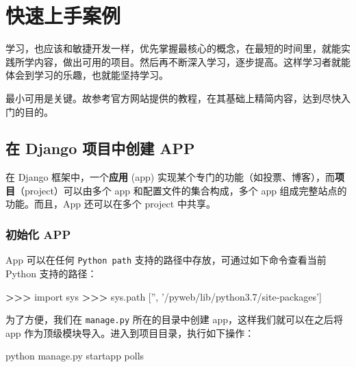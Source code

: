 \documentclass[]{ctexbook}
\newenvironment{Shaded}{\begin{snugshade}}{\end{snugshade}}
\newcommand{\ExtensionTok}[1]{#1}
\newcommand{\ImportTok}[1]{#1}
\newcommand{\NormalTok}[1]{#1}
\newcommand{\OperatorTok}[1]{\textcolor[rgb]{0.81,0.36,0.00}{\textbf{#1}}}
\newcommand{\StringTok}[1]{\textcolor[rgb]{0.31,0.60,0.02}{#1}}
\begin{document}
\hypertarget{quicktutorial}{%
\chapter{快速上手案例}\label{quicktutorial}}

学习，也应该和敏捷开发一样，优先掌握最核心的概念，在最短的时间里，就能实践所学内容，做出可用的项目。然后再不断深入学习，逐步提高。这样学习者就能体会到学习的乐趣，也就能坚持学习。

最小可用是关键。故参考官方网站提供的教程，在其基础上精简内容，达到尽快入门的目的。

\hypertarget{ux5728-django-ux9879ux76eeux4e2dux521bux5efa-app}{%
\section{在 Django 项目中创建 APP}\label{ux5728-django-ux9879ux76eeux4e2dux521bux5efa-app}}

在 Django 框架中，一个\textbf{应用} (app) 实现某个专门的功能（如投票、博客），而\textbf{项目}（project）可以由多个 app 和配置文件的集合构成，多个 app 组成完整站点的功能。而且，App 还可以在多个 project 中共享。

\hypertarget{ux521dux59cbux5316-app}{%
\subsection{初始化 APP}\label{ux521dux59cbux5316-app}}

App 可以在任何 \texttt{Python\ path} 支持的路径中存放，可通过如下命令查看当前 Python 支持的路径：

\begin{Shaded}
\begin{Highlighting}[]
\OperatorTok{>>>} \ImportTok{import}\NormalTok{ sys}
\OperatorTok{>>>}\NormalTok{ sys.path}
\NormalTok{[}\StringTok{''}\NormalTok{, }\StringTok{'/pyweb/lib/python3.7/site-packages'}\NormalTok{]}
\end{Highlighting}
\end{Shaded}

为了方便，我们在 \texttt{manage.py} 所在的目录中创建 app，这样我们就可以在之后将 app 作为顶级模块导入。进入到项目目录，执行如下操作：

\begin{Shaded}
\begin{Highlighting}[]
\ExtensionTok{python}\NormalTok{ manage.py startapp polls}
\end{Highlighting}
\end{Shaded}
\end{document}
